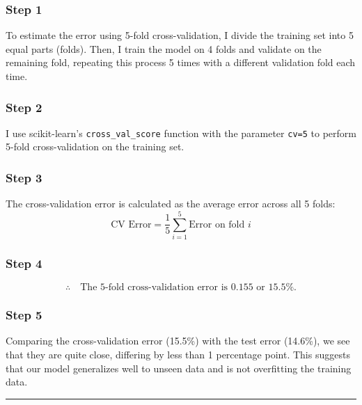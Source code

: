 \documentclass{article}
\begin{document}
\subsubsection*{Step 1}
\parbox{\textwidth}{
To estimate the error using 5-fold cross-validation, I divide the training set into 5 equal parts (folds). Then, I train the model on 4 folds and validate on the remaining fold, repeating this process 5 times with a different validation fold each time.
}

\subsubsection*{Step 2}
\parbox{\textwidth}{
I use scikit-learn's \texttt{cross\_val\_score} function with the parameter \texttt{cv=5} to perform 5-fold cross-validation on the training set.
}

\subsubsection*{Step 3}
\parbox{\textwidth}{
The cross-validation error is calculated as the average error across all 5 folds:
\[
\text{CV Error} = \frac{1}{5} \sum_{i=1}^{5} \text{Error on fold } i
\]
}

\subsubsection*{Step 4}
\parbox{\textwidth}{
\[
\therefore \quad \text{The 5-fold cross-validation error is } 0.155 \text{ or } 15.5\%.
\]
}

\subsubsection*{Step 5}
\parbox{\textwidth}{
Comparing the cross-validation error (15.5\%) with the test error (14.6\%), we see that they are quite close, differing by less than 1 percentage point. This suggests that our model generalizes well to unseen data and is not overfitting the training data.
}

\noindent\rule{\textwidth}{0.4pt}\\
\end{document}
